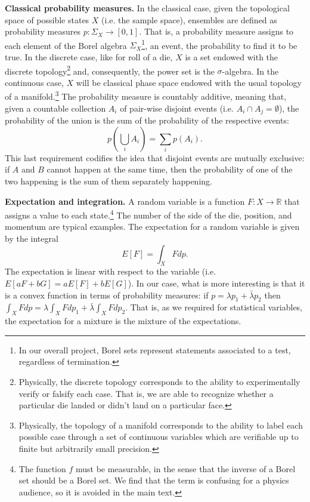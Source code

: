 \documentclass[10pt,twocolumn, nofootinbib]{revtex4-2}
\begin{document}
\textbf{Classical probability measures.} In the classical case, given the topological space of possible states $X$ (i.e. the sample space), ensembles are defined as probability measures $p : \Sigma_X \to [0,1]$. That is, a probability measure assigns to each element of the Borel algebra $\Sigma_X$\footnote{In our overall project, Borel sets represent statements associated to a test, regardless of termination.}, an event, the probability to find it to be true. In the discrete case, like for roll of a die, $X$ is a set endowed with the discrete topology\footnote{Physically, the discrete topology corresponds to the ability to experimentally verify or falsify each case. That is, we are able to recognize whether a particular die landed or didn't land on a particular face.} and, consequently, the power set is the $\sigma$-algebra. In the continuous case, $X$ will be classical phase space endowed with the usual topology of a manifold.\footnote{Physically, the topology of a manifold corresponds to the ability to label each possible case through a set of continuous variables which are verifiable up to finite but arbitrarily small precision.}  The probability measure is countably additive, meaning that, given a countable collection $A_i$ of pair-wise disjoint events (i.e. $A_i \cap A_j = \emptyset$), the probability of the union is the sum of the probability of the respective events:
\begin{equation}
	p\left(\bigcup_i A_i \right) = \sum_i p(A_i).
\end{equation}
This last requirement codifies the idea that disjoint events are mutually exclusive: if $A$ and $B$ cannot happen at the same time, then the probability of one of the two happening is the sum of them separately happening.

\textbf{Expectation and integration.} A random variable is a function $F : X \to \mathbb{R}$ that assigns a value to each state.\footnote{The function $f$ must be measurable, in the sense that the inverse of a Borel set should be a Borel set. We find that the term is confusing for a physics audience, so it is avoided in the main text.} The number of the side of the die, position, and momentum are typical examples. The expectation for a random variable is given by the integral
\begin{equation}
	E[F] = \int_X F dp.
\end{equation}
The expectation is linear with respect to the variable (i.e. $E[aF+bG]= aE[F]+bE[G]$). In our case, what is more interesting is that it is a convex function in terms of probability measures: if $p = \lambda p_1 + \bar{\lambda} p_2$ then $\int_X F dp = \lambda \int_X F dp_1 + \bar{\lambda} \int_X F dp_2$. That is, as we required for statistical variables, the expectation for a mixture is the mixture of the expectations.
\end{document}
